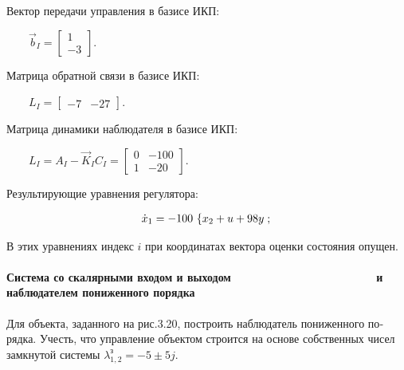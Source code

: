 \documentclass[a4paper]{article}
\newcommand\normalsubformula[1]{\text{\mathversion{normal}$#1$}}
\begin{document}
{\begin{russian}\sffamily
Вектор передачи управления в базисе ИКП:
\end{russian}}

{\begin{russian}\sffamily
\ \ \ \  $\vec b_I=\left[\begin{matrix}1\\-3\end{matrix}\right]$.
\end{russian}}

{\begin{russian}\sffamily
Матрица обратной связи в базисе ИКП:
\end{russian}}

{\begin{russian}\sffamily
\ \ \ \  $L_I=\left[\begin{matrix}-7&-27\end{matrix}\right]$.
\end{russian}}


\bigskip


\bigskip


\bigskip

{\begin{russian}\sffamily
Матрица динамики наблюдателя в базисе ИКП:
\end{russian}}

{\begin{russian}\sffamily
\ \ \ \  $L_I=A_I-\vec K_IC_I=\left[\begin{matrix}0&-100\\1&-20\end{matrix}\right]$.
\end{russian}}

{\begin{russian}\sffamily
Результирующие уравнения регулятора:
\end{russian}}

\begin{equation*}
\begin{matrix}\dot x_1=-\text{100 \{}\normalsubformula x_2+u+98y\;;\hfill\null \end{matrix}\hfill 
\end{equation*}
{\begin{russian}\sffamily
В этих уравнениях индекс  $i$ при координатах вектора оценки состояния опущен.
\end{russian}}


\bigskip

\paragraph[Система со скалярными входом и выходом \ \ \ \ \ \ \ \ \ \ \ \ \ \ \ \ \ \ \ \ \ \ и наблюдателем пониженного
порядка]{Система со скалярными входом и выходом \ \ \ \ \ \ \ \ \ \ \ \ \ \ \ \ \ \ \ \ \ \ и наблюдателем пониженного
порядка}
{\begin{russian}\sffamily
Для объекта, заданного на рис.3.20, построить наблюдатель пониженного порядка. Учесть, что управление объектом строится
на основе собственных чисел замкнутой системы  $λ_{1,2}^з=-5\pm 5j$.
\end{russian}}
\end{document}
